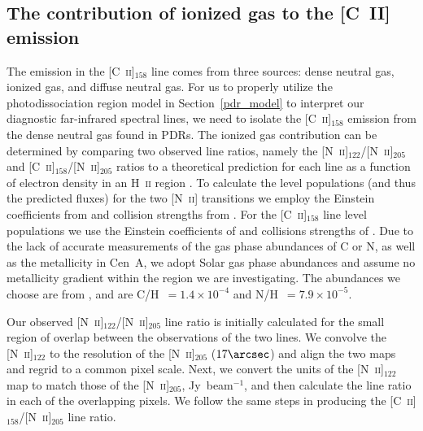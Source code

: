 \documentclass[preprint2]{aastex}
\begin{document}
\subsection{The contribution of ionized gas to the [C~{\footnotesize II}] emission}\label{ion_gas}
The emission in the [C~\textsc{ii}]$_{158}$ line comes from three sources: dense neutral gas, ionized gas, and diffuse neutral gas.  For us to properly utilize the photodissociation region model in Section~\ref{pdr_model} to interpret our diagnostic far-infrared spectral lines, we need to isolate the [C~\textsc{ii}]$_{158}$ emission from the dense neutral gas found in PDRs.  The ionized gas contribution can be determined by comparing two observed line ratios, namely the [N~\textsc{ii}]$_{122}$/[N~\textsc{ii}]$_{205}$ and [C~\textsc{ii}]$_{158}$/[N~\textsc{ii}]$_{205}$ ratios to a theoretical prediction for each line as a function of electron density in an H~\textsc{ii} region \citep[e.g.][]{2006ApJ...652L.125O, parkin_2013}.  To calculate the level populations (and thus the predicted fluxes) for the two [N~\textsc{ii}] transitions we employ the Einstein coefficients from \citet{1997A&AS..123..159G} and collision strengths from \citet{2004MNRAS.348.1275H}.  For the [C~\textsc{ii}]$_{158}$ line level populations we use the Einstein coefficients of \citet{1998A&AS..131..499G} and collisions strengths of 
\citet{1992ApJS...80..425B}.  Due to the lack of accurate measurements of the gas phase abundances of C or N, as well as the metallicity in Cen~A, we adopt Solar gas phase abundances and assume no metallicity gradient within the region we are investigating.   The abundances we choose are from \citet{1996ARA&A..34..279S}, and are C/H~$= 1.4 \times 10^{-4}$ and N/H~$= 7.9 \times 10^{-5}$.



Our observed [N~\textsc{ii}]$_{122}$/[N~\textsc{ii}]$_{205}$ line ratio is initially calculated for the small region of overlap between the observations of the two lines.  We convolve the [N~\textsc{ii}]$_{122}$ to the resolution of the [N~\textsc{ii}]$_{205}$ ($17\arcsec$) and align the two maps and regrid to a common pixel scale.  Next, we convert the units of the [N~\textsc{ii}]$_{122}$ map to match those of the [N~\textsc{ii}]$_{205}$, Jy~beam$^{-1}$, and then calculate the line ratio in each of the overlapping pixels.  We follow the same steps in producing the [C~\textsc{ii}]$_{158}$/[N~\textsc{ii}]$_{205}$ line ratio.
\end{document}
